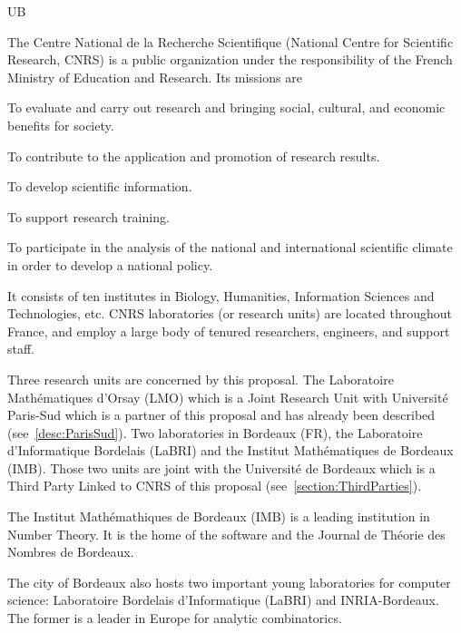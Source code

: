 \begin{sitedescription}{UB} \label{desc:Bordeaux}


The Centre National de la Recherche Scientifique (National Centre for
Scientific Research, CNRS) is a public organization under the responsibility of
the French Ministry of Education and Research. Its missions are
\begin{compactitem}
\item To evaluate and carry out research and
bringing social, cultural, and economic benefits for society.
\item To contribute to the application and promotion of research results.
\item To develop scientific information.
\item To support research training.
\item To participate in the analysis of the national and international
scientific climate in order to develop a
national policy.
\end{compactitem}
It consists of ten institutes in Biology, Humanities, Information Sciences and
Technologies, etc. CNRS laboratories (or research units) are located throughout
France, and employ a large body of tenured researchers, engineers, and support
staff.

Three research units are concerned by this proposal. The Laboratoire
Math\'ematiques d'Orsay (LMO) which is a Joint Research Unit with Université Paris-Sud
which is a partner of this proposal and has already been described
(see~\ref{desc:ParisSud}). Two laboratories in Bordeaux (FR), the Laboratoire
d'Informatique Bordelais (LaBRI) and the Institut Math\'ematiques de
Bordeaux (IMB). Those two units are joint with the Universit\'e de
Bordeaux which is a Third Party Linked to CNRS of this proposal
(see~\ref{section:ThirdParties}).

The Institut Math\'emathiques de Bordeaux (IMB) is a leading
institution in Number Theory. It is the home of the software
\PariGP and the Journal de Th\'eorie des Nombres de Bordeaux.

The city of Bordeaux also hosts two important young laboratories
for computer science: Laboratoire Bordelais d'Informatique (LaBRI)
and INRIA-Bordeaux. The former is a leader in Europe for analytic
combinatorics.


\end{sitedescription}
